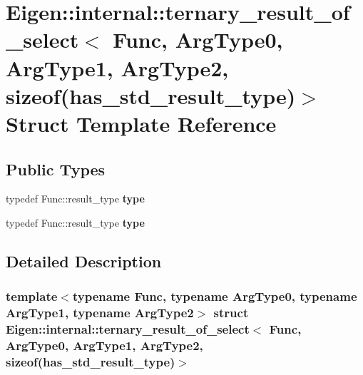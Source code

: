 \hypertarget{struct_eigen_1_1internal_1_1ternary__result__of__select_3_01_func_00_01_arg_type0_00_01_arg_type08876e51e06da3c04eed1c2a00032f26}{}\section{Eigen\+:\+:internal\+:\+:ternary\+\_\+result\+\_\+of\+\_\+select$<$ Func, Arg\+Type0, Arg\+Type1, Arg\+Type2, sizeof(has\+\_\+std\+\_\+result\+\_\+type)$>$ Struct Template Reference}
\label{struct_eigen_1_1internal_1_1ternary__result__of__select_3_01_func_00_01_arg_type0_00_01_arg_type08876e51e06da3c04eed1c2a00032f26}
\subsection*{Public Types}
\begin{DoxyCompactItemize}
\item 
\mbox{\label{struct_eigen_1_1internal_1_1ternary__result__of__select_3_01_func_00_01_arg_type0_00_01_arg_type08876e51e06da3c04eed1c2a00032f26_a94a87d65f800082633c13bb55453e9e5}} 
typedef Func\+::result\+\_\+type {\bfseries type}
\item 
\mbox{\label{struct_eigen_1_1internal_1_1ternary__result__of__select_3_01_func_00_01_arg_type0_00_01_arg_type08876e51e06da3c04eed1c2a00032f26_a94a87d65f800082633c13bb55453e9e5}} 
typedef Func\+::result\+\_\+type {\bfseries type}
\end{DoxyCompactItemize}


\subsection{Detailed Description}
\subsubsection*{template$<$typename Func, typename Arg\+Type0, typename Arg\+Type1, typename Arg\+Type2$>$\newline
struct Eigen\+::internal\+::ternary\+\_\+result\+\_\+of\+\_\+select$<$ Func, Arg\+Type0, Arg\+Type1, Arg\+Type2, sizeof(has\+\_\+std\+\_\+result\+\_\+type)$>$}



